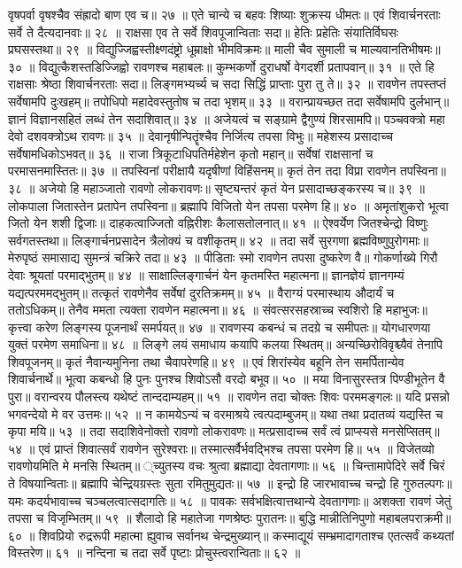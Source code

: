 वृषपर्वा वृषश्चैव संह्रादो बाण एव च॥ २७ ॥
एते चान्ये च बहवः शिष्याः शुक्रस्य धीमतः॥
एवं शिवार्चनरताः सर्वे ते दैत्यदानवाः॥ २८ ॥
राक्षसा एव ते सर्वे शिवपूजान्विताः सदा॥
हेतिः प्रहेतिः संयातिर्विघसः प्रघसस्तथा॥ २९ ॥
विद्युज्जिह्वस्तीक्ष्णदंष्ट्रो धूम्राक्षो भीमविक्रमः॥
माली चैव सुमाली च माल्यवानतिभीषमः॥ ३० ॥
विद्युत्कैशस्तडिज्जिह्वो रावणश्च महाबलः॥
कुम्भकर्णो दुराधर्षो वेगदर्शी प्रतापवान्॥ ३१ ॥
एते हि राक्षसाः श्रेष्ठा शिवार्चनरताः सदा॥
लिङ्गमभ्यर्च्य च सदा सिद्धिं प्राप्ताः पुरा तु ते॥ ३२ ॥
रावणेन तपस्तप्तं सर्वेषामपि दुःखहम्॥
तपोधिपो महादेवस्तुतोष च तदा भृशम्॥ ३३ ॥
वरान्प्रायच्छत तदा सर्वेषामपि दुर्लभान्॥
ज्ञानं विज्ञानसहितं लब्धं तेन सदाशिवात्॥ ३४ ॥
अजेयत्वं च सङ्ग्रामे द्वैगुण्यं शिरसामपि॥
पञ्चवक्त्रो महा देवो दशवक्त्रोऽथ रावणः॥ ३५ ॥
देवानृषीन्पितॄंश्चैव निर्जित्य तपसा विभुः॥
महेशस्य प्रसादाच्च सर्वेषामधिकोऽभवत्॥ ३६ ॥
राजा त्रिकूटाधिपतिर्महेशेन कृतो महान्॥
सर्वेषां राक्षसानां च परमासनमास्तितः॥ ३७ ॥
तपस्विनां परीक्षायै यदृषीणां विहिंसनम्॥
कृतं तेन तदा विप्रा रावणेन तपस्विना॥ ३८ ॥
अजेयो हि महाञ्जातो रावणो लोकरावणः॥
सृष्ट्यन्तरं कृतं येन प्रसादाच्छङ्करस्य च॥ ३९ ॥
लोकपाला जितास्तेन प्रतापेन तपस्विना॥
ब्रह्मापि विजितो येन तपसा परमेण हि॥ ४० ॥
अमृतांशुकरो भूत्वा जितो येन शशी द्विजाः॥
दाहकत्वाज्जितो वह्निरीशः कैलासतोलनात्॥ ४१ ॥
ऐश्वर्येण जितश्चेन्द्रो विष्णुः सर्वगतस्तथा॥
लिङ्गार्चनप्रसादेन त्रैलोक्यं च वशीकृतम्॥ ४२ ॥
तदा सर्वे सुरगणा ब्रह्मविष्णुपुरोगमाः॥
मेरुपृष्ठं समासाद्य सुमन्त्रं चक्रिरे तदा॥ ४३ ॥
पीडिताः स्मो रावणेन तपसा दुष्करेण वै॥
गोकर्णाख्ये गिरौ देवाः श्रूयतां परमाद्भुतम्॥ ४४ ॥
साक्षाल्लिङ्गार्चनं येन कृतमस्ति महात्मना॥
ज्ञानज्ञेयं ज्ञानगम्यं यद्यत्परममद्भुतम्॥
तत्कृतं रावणेनैव सर्वेषां दुरतिक्रमम्॥ ४५ ॥
वैराग्यं परमास्थाय औदार्यं च ततोऽधिकम्॥
तेनैव ममता त्यक्ता रावणेन महात्मना॥ ४६ ॥
संवत्सरसहस्राच्च स्वशिरो हि महाभुजः॥
कृत्त्वा करेण लिङ्गस्य पूजनार्थं समर्पयत्॥ ४७ ॥
रावणस्य कबन्धं च तदग्रे च समीपतः॥
योगधारणया युक्तं परमेण समाधिना॥ ४८ ॥
लिङ्गे लयं समाधाय कयापि कलया स्थितम्॥
अन्यच्छिरोविवृश्च्यैवं तेनापि शिवपूजनम्॥
कृतं नैवान्यमुनिना तथा चैवापरेणहि॥ ४९ ॥
एवं शिरांस्येव बहूनि तेन समर्पितान्येव शिवार्चनार्थे॥
भूत्वा कबन्धो हि पुनः पुनश्च शिवोऽसौ वरदो बभूव॥ ५० ॥
मया विनासुरस्तत्र पिण्डीभूतेन वै पुरा॥
वरान्वरय पौलस्त्य यथेष्टं तान्ददाम्यहम्॥ ५१ ॥
रावणेन तदा चोक्तः शिवः परममङ्गलः॥
यदि प्रसन्नो भगवन्देयो मे वर उत्तमः॥ ५२ ॥
न कामयेऽन्यं च वरमाश्रये त्वत्पदाम्बुजम्॥
यथा तथा प्रदातव्यं यद्यस्ति च कृपा मयि॥ ५३ ॥
तदा सदाशिवेनोक्तो रावणो लोकरावणः॥
मत्प्रसादाच्च सर्वं त्वं प्राप्स्यसे मनसेप्सितम्॥ ५४ ॥
एवं प्राप्तं शिवात्सर्वं रावणेन सुरेश्वराः॥
तस्मात्सर्वैर्भवद्भिश्च तपसा परमेण हि॥ ५५ ॥
विजेतव्यो रावणोयमिति मे मनसि स्थितम्॥
्च्युतस्य वचः श्रुत्वा ब्रह्माद्या देवतागणाः॥ ५६ ॥
चिन्तामापेदिरे सर्वे चिरं ते विषयान्विताः॥
ब्रह्मापि चेन्द्रियग्रस्तः सुता रमितुमुद्यतः॥ ५७ ॥
इन्द्रो हि जारभावाच्च चन्द्रो हि गुरुतल्पगः॥
यमः कदर्यभावाच्च चञ्चलत्वात्सदागतिः॥ ५८ ॥
पावकः सर्वभक्षित्वात्तथान्ये देवतागणाः॥
अशक्ता रावणं जेतुं तपसा च विजृम्भितम्॥ ५९ ॥
शैलादो हि महातेजा गणश्रेष्ठः पुरातनः॥
बुद्धि मान्नीतिनिपुणो महाबलपराक्रमी॥ ६० ॥
शिवप्रियो रुद्ररूपी महात्मा ह्युवाच सर्वानथ चेन्द्रमुख्यान्॥
कस्माद्यूयं सम्भ्रमादागताश्च एतत्सर्वं कथ्यतां विस्तरेण॥ ६१ ॥
नन्दिना च तदा सर्वे पृष्टाः प्रोचुस्त्वरान्विताः॥ ६२ ॥

